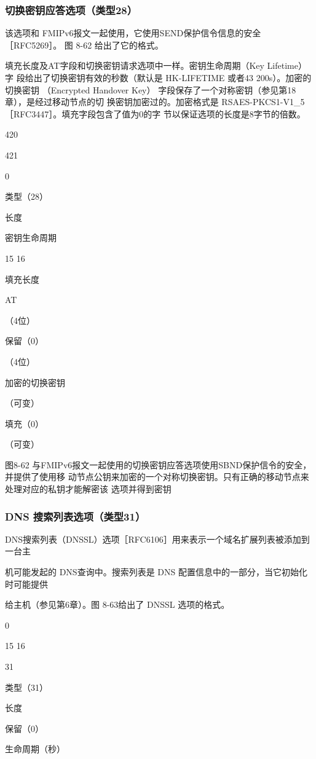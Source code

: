 \subsubsection{切换密钥应答选项（类型28）}
该选项和 FMIPv6报文一起使用，它使用SEND保护信令信息的安全 ［RFC5269］。
图 8-62 给出了它的格式。

填充长度及AT字段和切换密钥请求选项中一样。密钥生命周期（Key Lifetime）字
段给出了切换密钥有效的秒数（默认是 HK-LIFETIME 或者43 200s）。加密的切换密钥
（Encrypted Handover Key） 字段保存了一个对称密钥（参见第18章），是经过移动节点的切
换密钥加密过的。加密格式是 RSAES-PKCS1-V1\_5［RFC3447］。填充字段包含了值为0的字
节以保证选项的长度是8字节的倍数。

420

421

0

类型（28）

长度

密钥生命周期

15 16

填充长度

AT

（4位）

保留（0）

（4位）

加密的切换密钥

（可变）

填充（0）

（可变）

图8-62 与FMIPv6报文一起使用的切换密钥应答选项使用SBND保护信令的安全，并提供了使用移
动节点公钥来加密的一个对称切换密钥。只有正确的移动节点来处理对应的私钥才能解密该
选项并得到密钥

\subsubsection{DNS 搜索列表选项（类型31）}
DNS搜索列表（DNSSL）选项［RFC6106］用来表示一个域名扩展列表被添加到一台主

机可能发起的 DNS查询中。搜索列表是 DNS 配置信息中的一部分，当它初始化时可能提供

给主机（参见第6章）。图 8-63给出了 DNSSL 选项的格式。

0

15 16

31

类型（31）

长度

保留（0）

生命周期（秒）

